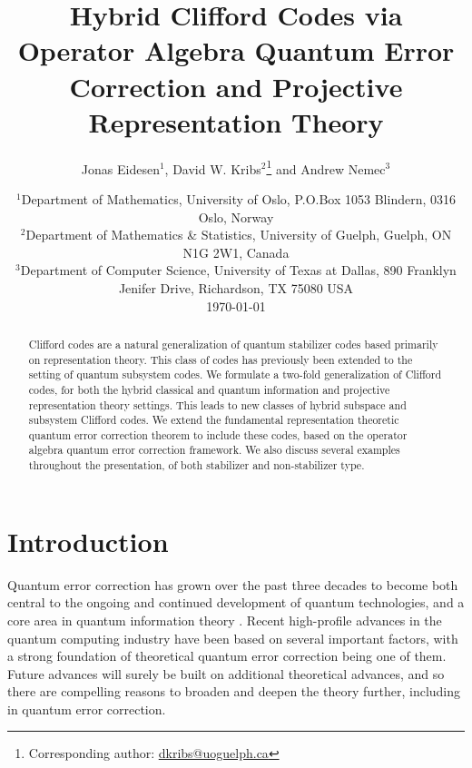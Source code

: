 \documentclass[11pt]{article}
\title{Hybrid Clifford Codes via Operator Algebra Quantum Error Correction and Projective Representation Theory}
\author{Jonas Eidesen$^1$, David W. Kribs$^{2}$\footnote{Corresponding author: \href{mailto:dkribs@uoguelph.ca}{dkribs@uoguelph.ca}} and Andrew Nemec$^3$}
\date{\small
$^1$Department of Mathematics, University of Oslo, 
P.O.Box 1053 Blindern,
0316 Oslo,
Norway \\
$^2$Department of Mathematics \& Statistics, University of Guelph, Guelph, ON N1G 2W1, Canada \\ 
$^3$Department of Computer Science, University of Texas at Dallas, 890 Franklyn Jenifer Drive, Richardson, TX 75080 USA \\
\normalsize \today
}
\theoremstyle{definition}
\begin{document}
\maketitle

\begin{abstract}
Clifford codes are a natural generalization of quantum stabilizer codes based primarily on representation theory. This class of codes has previously been extended to the setting of quantum subsystem codes. We formulate a two-fold generalization of Clifford codes, for both the hybrid classical and quantum information and projective representation theory settings. This leads to new classes of hybrid subspace and subsystem Clifford codes. We extend the fundamental representation theoretic quantum error correction theorem to include these codes, based on the operator algebra quantum error correction framework. We also discuss several examples throughout the presentation, of both stabilizer and non-stabilizer type. 
\end{abstract}


\section{Introduction}

Quantum error correction has grown over the past three decades to become both central to the ongoing and continued development of quantum technologies, and a core area in quantum information theory \cite{nielsen_chuang_2010,lidar2013quantum}. Recent high-profile advances in the quantum computing industry have been based on several important factors, with a strong foundation of theoretical quantum error correction being one of them. Future advances will surely be built on additional theoretical advances, and so there are compelling reasons to broaden and deepen the theory further, including in quantum error correction. 
\end{document}
